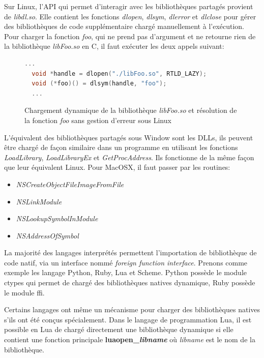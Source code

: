 Sur Linux, l'API qui permet d'interagir avec les bibliothèques partagés provient de \textit{libdl.so}.
Elle contient les fonctions \textit{dlopen}, \textit{dlsym}, \textit{dlerror} et \textit{dlclose} pour gérer
des bibliothèques de code supplémentaire chargé manuellement à l'exécution.  Pour charger la fonction
\textit{foo}, qui ne prend pas d'argument et ne retourne rien de la bibliothèque \textit{libFoo.so} en C,
il faut exécuter les deux appels suivant:
\begin{center}
  \begin{figure}[ht]
\begin{lstlisting}[language=C,frame=single]
  ...
  void *handle = dlopen("./libFoo.so", RTLD_LAZY);
  void (*foo)() = dlsym(handle, "foo");
  ...
\end{lstlisting}
\caption{Chargement dynamique de la bibliothèque \textit{libFoo.so} et
résolution de la fonction \textit{foo} sans gestion d'erreur sous Linux}
  \end{figure}
\end{center}
L'équivalent des bibliothèques partagés sous Window sont les DLLs, ils peuvent être chargé de façon similaire dans un
programme en utilisant les fonctions \textit{LoadLibrary}, \textit{LoadLibraryEx} et \textit{GetProcAddress}. Ils
fonctionne de la même façon que leur équivalent Linux. Pour MacOSX, il faut passer par les routines:
\begin{itemize}
    \item \textit{NSCreateObjectFileImageFromFile}
    \item \textit{NSLinkModule}
    \item \textit{NSLookupSymbolInModule}
    \item \textit{NSAddressOfSymbol}
\end{itemize}

La majorité des langages interprétés permettent l'importation de bibliothèque de code natif, via un interface
nommé \textit{foreign function interface}.
Prenons comme exemple les langage Python, Ruby, Lua et Scheme. Python possède le module ctypes
qui permet de chargé des bibliothèques natives dynamique, Ruby possède le module ffi.


Certains langages ont même un mécanisme pour charger des bibliothèques natives s'ils ont été conçus spécialement.
Dans le langage de programmation Lua, il est possible en Lua de chargé directement
une bibliothèque dynamique si elle contient une fonction principale \textbf{luaopen\_\textit{libname}}
où \textit{libname} est le nom de la bibliothèque.

